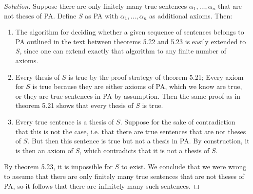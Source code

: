 \begin{proof}[Solution]
  Suppose there are only finitely many true sentences $\alpha_1, \ldots, \alpha_n$ that are not theses of PA. Define $S$ as PA with $\alpha_1,\ldots, \alpha_n$ as additional axioms. Then:

  \begin{enumerate}[font=\normalfont,label=\textbf{(\Alph*)}, wide]
    \item The algorithm for deciding whether a given sequence of sentences belongs to PA outlined in the text between theorems 5.22 and 5.23 is easily extended to $S$, since one can extend exactly that algorithm to any finite number of axioms.

    \item Every thesis of $S$ is true by the proof strategy of theorem 5.21; Every axiom for $S$ is true because they are either axioms of PA, which we know are true, or they are true sentences in PA by assumption. Then the same proof as in theorem 5.21 shows that every thesis of $S$ is true.

    \item Every true sentence is a thesis of $S$. Suppose for the sake of contradiction that this is not the case, i.e. that there are true sentences that are not theses of $S$. But then this sentence is true but not a thesis in PA. By construction, it is then an axiom of $S$, which contradicts that it is not a thesis of $S$.
  \end{enumerate}
By theorem 5.23, it is impossible for $S$ to exist. We conclude that we were wrong to assume that there are only finitely many true sentences that are not theses of PA, so it follows that there are infinitely many such sentences.

\end{proof}


